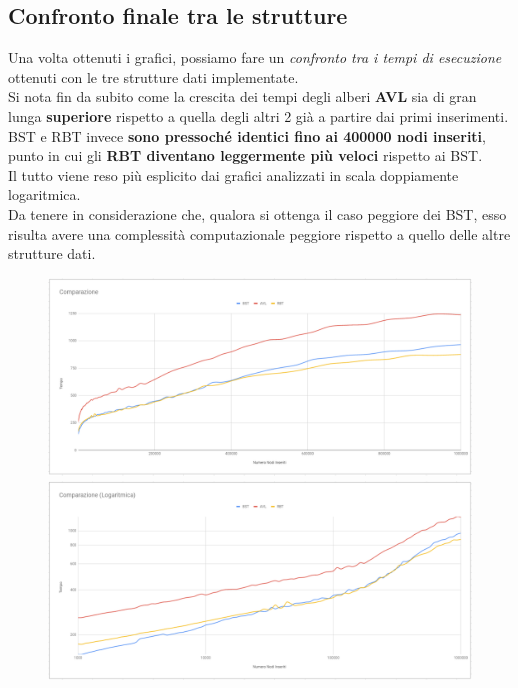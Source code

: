 \documentclass[a4paper]{article}
\begin{document}
		\subsection{Confronto finale tra le strutture}
		Una volta ottenuti i grafici, possiamo fare un \textit{confronto tra i tempi di esecuzione} ottenuti con le tre strutture dati implementate.\\
		Si nota fin da subito come la crescita dei tempi degli alberi \textbf{AVL} sia di gran lunga \textbf{superiore} rispetto a quella degli altri 2 già a partire dai primi inserimenti.\\
		BST e RBT invece \textbf{sono pressoché identici fino ai 400000 nodi inseriti}, punto in cui gli \textbf{RBT diventano leggermente più veloci} rispetto ai BST. \\
		Il tutto viene reso più esplicito dai grafici analizzati in scala doppiamente logaritmica.\\
		Da tenere in considerazione che, qualora si ottenga il caso peggiore dei BST, esso risulta avere una complessità computazionale peggiore rispetto a quello delle altre strutture dati.
		\begin{figure}[ht]
			\includegraphics[width=13cm]{ComaprazioneLIN}
			\includegraphics[width=13cm]{ComparazioneLOG}
		\end{figure}
	
\end{document}

